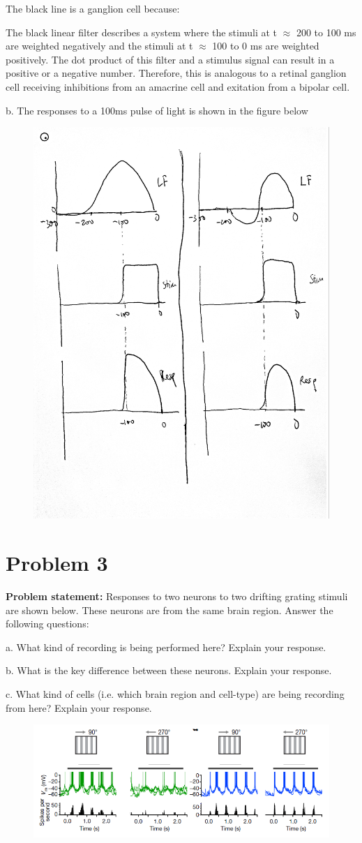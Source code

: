 \documentclass[letterpaper, 11pt]{article}
\begin{document}
The black line is a ganglion cell because:

The black linear filter describes a system where the stimuli at t  $\approx$ 200 to 100 ms are weighted negatively and the stimuli at t  $\approx$ 100 to 0 ms are weighted positively. The dot product of this filter and a stimulus signal can result in a positive or a negative number. Therefore, this is analogous to a retinal ganglion cell receiving inhibitions from an amacrine cell and exitation from a bipolar cell.

b. The responses to a 100ms pulse of light is shown in the figure below

\begin{figure}[htb!]
	\centering
	\includegraphics[width=0.5\linewidth]{2.jpg}
\end{figure}

\section{Problem 3}
\label{sec:prob3}
\textbf{Problem statement:} Responses to two neurons to two drifting grating stimuli are shown below. These neurons are from the same brain region. Answer the following questions:

a. What kind of recording is being performed here? Explain your response.

b. What is the key difference between these neurons. Explain your response.

c. What kind of cells (i.e. which brain region and cell-type) are being recording from here? Explain your response.

\begin{figure}[htb!]
	\centering
	\includegraphics[width=0.8\linewidth]{fig3.png}
	\label{fig3}
\end{figure}
\end{document}
